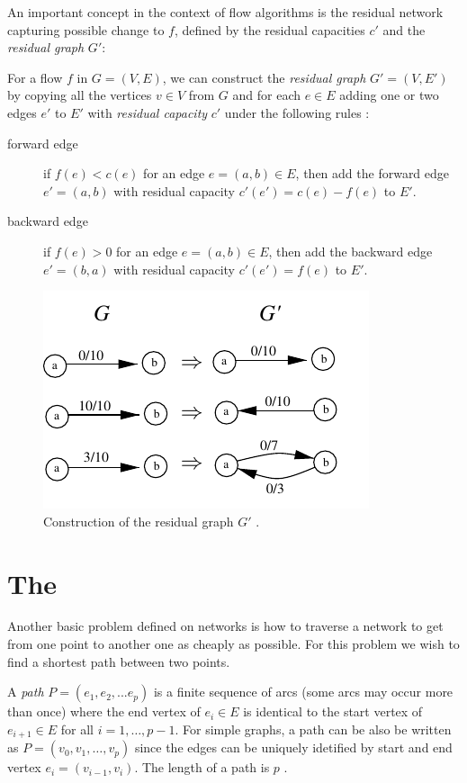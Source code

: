 An important concept in the context of flow algorithms is the residual network capturing possible change to $f$, defined by the residual capacities $c'$ and the \textit{residual graph} $G'$:
\begin{definition}
For a flow $f$ in $G=(V,E)$, we can construct the \textit{residual graph} $G' = (V,E')$ by copying all the vertices $v \in V$ from $G$ and for each $e \in E$ adding one or two edges $e'$ to $E'$ with \textit{residual capacity} $c'$ under the following rules :
\begin{description}
\item[forward edge] if $f(e) < c(e)$ for an edge $e=(a,b) \in E$, then add the forward edge $e' = (a,b)$ with residual capacity $c'(e') = c(e) - f(e)$ to $E'$.
\item[backward edge] if $f(e) > 0$ for an edge $e=(a,b) \in E$, then add the backward edge $e' = (b,a)$ with residual capacity $c'(e') = f(e)$ to $E'$.
\end{description}
\end{definition}

\begin{figure}
\centering
\includegraphics[]{fig/residual}
\caption{Construction of the residual graph $G'$ \cite{mayer2013prakt}.}
\label{fig:residual}
\end{figure}



\section{The \spprc{}}
Another basic problem defined on networks is how to traverse a network to get from one point to another one as cheaply as possible. For this problem we wish to find a shortest path between two points.

\begin{definition}[path]
A \textit{path} $P = (e_1, e_2, ... e_p)$ is a finite sequence of arcs (some arcs may occur more than once) where the end vertex of $e_i \in E$ is identical to the start vertex of $e_{i+1} \in E$ for all $i=1,\dots,p-1$. For simple graphs, a path can be also be written as $P = (v_0,v_1,\dots,v_p)$ since the edges can be uniquely idetified by start and end vertex $e_i=(v_{i-1},v_i)$. The length of a path is $p$ \cite{irnich2005shortest}.
\end{definition}


